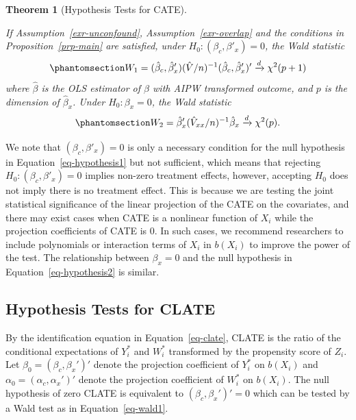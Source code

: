 \documentclass[
  12pt,
  12pt]{article}
\numberwithin{equation}{section}
\theoremstyle{definition}
\theoremstyle{plain}
\theoremstyle{plain}
\newtheorem{theorem}{Theorem}[section]
\theoremstyle{remark}
\begin{document}
\begin{theorem}[Hypothesis Tests for
CATE]\protect\hypertarget{thm-cate}{}\label{thm-cate}

If Assumption~\ref{exr-unconfound}, Assumption~\ref{exr-overlap} and the
conditions in Proposition~\ref{prp-main} are satisfied, under
\(H_0: (\beta_c, \beta'_x) = 0\), the Wald statistic
\begin{equation}\phantomsection\label{eq-wald1}{
W_1 = (\hat\beta_c, \hat\beta'_x) (\hat{V}/n)^{-1} (\hat\beta_c, \hat\beta'_x)' \xrightarrow{d} \chi^2(p + 1)
}\end{equation} where \(\hat\beta\) is the OLS estimator of \(\beta\)
with AIPW transformed outcome, and \(p\) is the dimension of
\(\hat\beta_x\). Under \(H_0: \beta_x = 0\), the Wald statistic
\begin{equation}\phantomsection\label{eq-wald2}{
W_2 = \hat\beta'_x (\hat{V}_{xx}/n)^{-1} \hat\beta_x \xrightarrow{d} \chi^2(p).
}\end{equation}

\end{theorem}

We note that \((\beta_c, \beta'_x) = 0\) is only a necessary condition
for the null hypothesis in Equation~\ref{eq-hypothesis1} but not
sufficient, which means that rejecting \(H_0: (\beta_c, \beta'_x) = 0\)
implies non-zero treatment effects, however, accepting \(H_0\) does not
imply there is no treatment effect. This is because we are testing the
joint statistical significance of the linear projection of the CATE on
the covariates, and there may exist cases when CATE is a nonlinear
function of \(X_i\) while the projection coefficients of CATE is \(0\).
In such cases, we recommend researchers to include polynomials or
interaction terms of \(X_i\) in \(b(X_i)\) to improve the power of the
test. The relationship between \(\beta_x = 0\) and the null hypothesis
in Equation~\ref{eq-hypothesis2} is similar.

\subsection{Hypothesis Tests for CLATE}\label{sec-clatetest}

By the identification equation in Equation~\ref{eq-clate}, CLATE is the
ratio of the conditional expectations of \(Y^*_i\) and \(W^*_i\)
transformed by the propensity score of \(Z_i\). Let
\(\beta_0 = (\beta_c, \beta_x')'\) denote the projection coefficient of
\(Y^*_i\) on \(b(X_i)\) and \(\alpha_0 = (\alpha_c, \alpha_x')'\) denote
the projection coefficient of \(W^*_i\) on \(b(X_i)\). The null
hypothesis of zero CLATE is equivalent to \((\beta_c, \beta_x')' = 0\)
which can be tested by a Wald test as in Equation~\ref{eq-wald1}.
\end{document}
